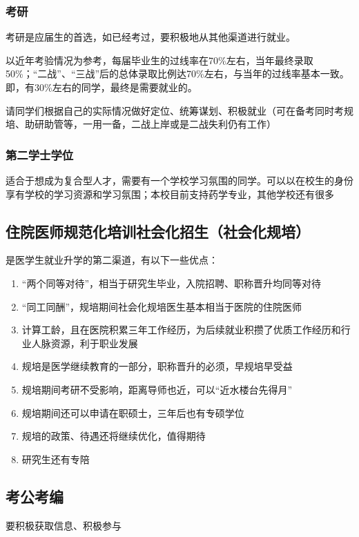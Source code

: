 \subsubsection[考研]{考研}
考研是应届生的首选，如已经考过，要积极地从其他渠道进行就业。

以近年考验情况为参考，每届毕业生的过线率在70\%左右，当年最终录取50\%；“二战”、“三战”后的总体录取比例达70\%左右，与当年的过线率基本一致。即，有30\%左右的同学，最终是需要就业的。

请同学们根据自己的实际情况做好定位、统筹谋划、积极就业（可在备考同时考规培、助研助管等，一用一备，二战上岸或是二战失利仍有工作）

\subsubsection[第二学士学位]{第二学士学位}
适合于想成为复合型人才，需要有一个学校学习氛围的同学。可以以在校生的身份享有学校的学习资源和学习氛围；本校目前支持药学专业，其他学校还有很多

\subsection[住院医师规范化培训社会化招生（社会化规培）]{住院医师规范化培训社会化招生（社会化规培）}
是医学生就业升学的第二渠道，有以下一些优点：
\begin{enumerate}
    \item “两个同等对待”，相当于研究生毕业，入院招聘、职称晋升均同等对待
    \item “同工同酬”，规培期间社会化规培医生基本相当于医院的住院医师
    \item 计算工龄，且在医院积累三年工作经历，为后续就业积攒了优质工作经历和行业人脉资源，利于职业发展
    \item 规培是医学继续教育的一部分，职称晋升的必须，早规培早受益
    \item 规培期间考研不受影响，距离导师也近，可以“近水楼台先得月”
    \item 规培期间还可以申请在职硕士，三年后也有专硕学位
    \item 规培的政策、待遇还将继续优化，值得期待
    \item 研究生还有专陪
\end{enumerate}

\subsection[考公考编]{考公考编}
要积极获取信息、积极参与

